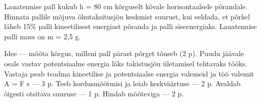 
Lauatennise pall kukub h = 80 cm kõrguselt kõvale horisontaalsele põrandale. Hinnata pallile mõjuva õhutaksitusjõu keskmist suurust, kui eeldada, et põrkel läheb 15\% palli kineetilisest energiast põranda ja palli siseenergiaks. Lauatennise palli mass on m = 2,5 g.

\hint

\solu
Idee --- mõõta kõrgus, milleni pall pärast põrget tõuseb (2 p). Puudu jäävale osale vastav potentsiaalne energia läks takistusjõu ületamisel tehtavaks tööks. Vastaja peab teadma kineetilise ja potentsiaalse energia valemeid ja töö valemit A = F s --- 3 p. Teeb kordusmõõtmisi ja leiab keskväärtuse --- 2 p. Avaldab õigesti otsitava suuruse --- 1 p. Hindab mõõteviga --- 2 p.
\probend
